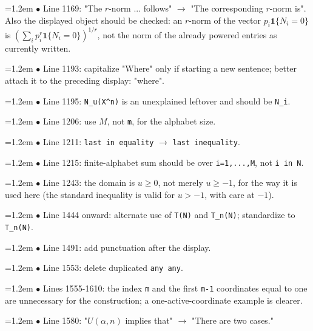 \documentclass[10pt,a4paper]{article}
\begin{document}
\par\smallskip\noindent\hangindent=1.2em $\bullet$ Line 1169: "The \(r\)-norm ... follows" $\to$ "The corresponding \(r\)-norm is". Also the displayed object should be checked: an \(r\)-norm of the vector \(p_i\mathbf1\{N_i=0\}\) is \((\sum_i p_i^r\mathbf1\{N_i=0\})^{1/r}\), not the norm of the already powered entries as currently written.
\par\smallskip\noindent\hangindent=1.2em $\bullet$ Line 1193: capitalize "Where" only if starting a new sentence; better attach it to the preceding display: "where".
\par\smallskip\noindent\hangindent=1.2em $\bullet$ Line 1195: \texttt{N\_\allowbreak{}u(X\textasciicircum{}\allowbreak{}n)} is an unexplained leftover and should be \texttt{N\_\allowbreak{}i}.
\par\smallskip\noindent\hangindent=1.2em $\bullet$ Line 1206: use \(M\), not \texttt{m}, for the alphabet size.
\par\smallskip\noindent\hangindent=1.2em $\bullet$ Line 1211: \texttt{last in equality} $\to$ \texttt{last inequality}.
\par\smallskip\noindent\hangindent=1.2em $\bullet$ Line 1215: finite-alphabet sum should be over \texttt{i=1,...,M}, not \texttt{i in N}.
\par\smallskip\noindent\hangindent=1.2em $\bullet$ Line 1243: the domain is \(u\ge0\), not merely \(u\ge-1\), for the way it is used here (the standard inequality is valid for \(u>-1\), with care at \(-1\)).
\par\smallskip\noindent\hangindent=1.2em $\bullet$ Line 1444 onward: alternate use of \texttt{T(N)} and \texttt{T\_\allowbreak{}n(N)}; standardize to \texttt{T\_\allowbreak{}n(N)}.
\par\smallskip\noindent\hangindent=1.2em $\bullet$ Line 1491: add punctuation after the display.
\par\smallskip\noindent\hangindent=1.2em $\bullet$ Line 1553: delete duplicated \texttt{any any}.
\par\smallskip\noindent\hangindent=1.2em $\bullet$ Lines 1555-1610: the index \texttt{m} and the first \texttt{m-1} coordinates equal to one are unnecessary for the construction; a one-active-coordinate example is clearer.
\par\smallskip\noindent\hangindent=1.2em $\bullet$ Line 1580: "\(U(\alpha,n)\) implies that" $\to$ "There are two cases."
\end{document}
